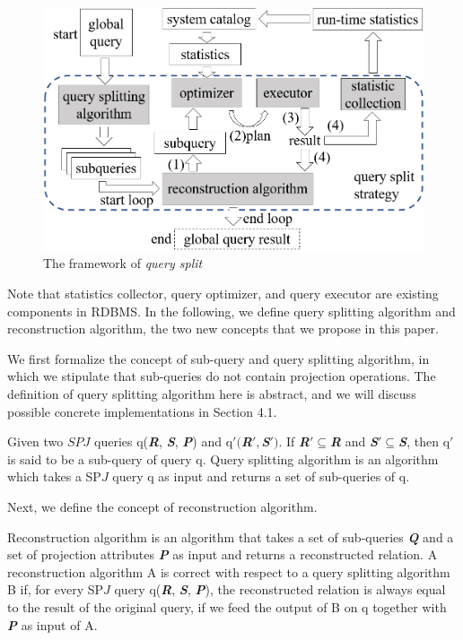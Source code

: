     \begin{figure}[htb]
        \centering
        \includegraphics[width=\linewidth]{./pic/Figure4.png}
        \caption{The framework of \textit{query split}}
        \label{F4}
        \Description{}
    \end{figure}\par
    Note that statistics collector, query optimizer, and query executor are existing components in RDBMS. In the following, we define query splitting algorithm and reconstruction algorithm, the two new concepts that we propose in this paper.\par
    We first formalize the concept of sub-query and query splitting algorithm, in which we stipulate that sub-queries do not contain projection operations. The definition of query splitting algorithm here is abstract, and we will discuss possible concrete implementations in Section 4.1.
    \begin{Definition} \label{D1}
        Given two $SPJ$ queries q(\textbf{\textit{R}}, \textbf{\textit{S}}, \textbf{\textit{P}}) and q$'($\textbf{\textit{R}}$',$\textbf{\textit{S}}$')$. If \textbf{\textit{R}}$'\subseteq$\textbf{\textit{R}} and \textbf{\textit{S}}$'\subseteq$\textbf{\textit{S}}, then q$'$ is said to be a sub-query of query q. Query splitting algorithm is an algorithm which takes a SP$J$ query q as input and returns a set of sub-queries of q.
    \end{Definition}\par
    Next, we define the concept of reconstruction algorithm.\par
    \begin{Definition} \label{D2}
        Reconstruction algorithm is an algorithm that takes a set of sub-queries \textbf{\textit{Q}} and a set of projection attributes \textbf{\textit{P}} as input and returns a reconstructed relation. A reconstruction algorithm A is correct with respect to a query splitting algorithm B if, for every SP$J$ query q(\textbf{\textit{R}}, \textbf{\textit{S}}, \textbf{\textit{P}}), the reconstructed relation is always equal to the result of the original query, if we feed the output of B on q together with \textbf{\textit{P}} as input of A.
    \end{Definition}\par
